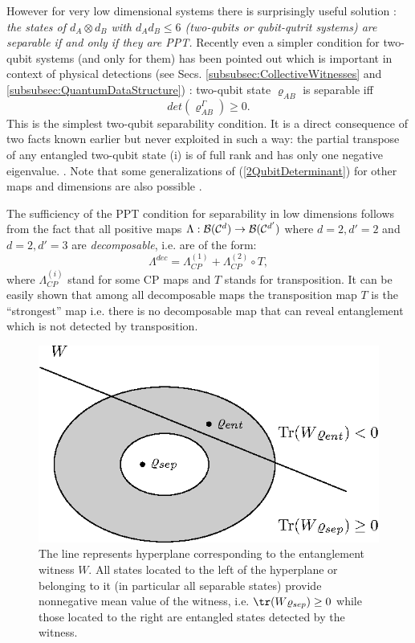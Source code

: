 \documentclass[rmp,12pt,preprint]{revtex4-2}
\begin{document}
However for very low dimensional systems there is surprisingly useful
solution \cite{sep1996}: {\it the states of $d_{A} \otimes d_{B} $
  with $d_{A}d_{B}\leq 6$ (two-qubits or qubit-qutrit systems) are
  separable if and only if they are PPT.} Recently even a simpler
condition for two-qubit systems (and only for them) has been pointed
out \cite{Augusiak} which is important in context of physical
detections (see Secs. \ref{subsubsec:CollectiveWitnesses} and
\ref{subsubsec:QuantumDataStructure}) : two-qubit state $\varrho_{AB}$
is separable iff
\begin{equation}
det(\varrho_{AB}^{\Gamma})\geq 0 \label{2QubitDeterminant}.
\end{equation}
This is the simplest two-qubit separability condition. It is a direct
consequence of two facts known earlier but never exploited in such a
way: the partial transpose of any entangled two-qubit state (i) is of
full rank and has only one negative eigenvalue.
\cite{SanperaTarrachVidal,Verstraete(i-ii)}. Note that some
generalizations of (\ref{2QubitDeterminant}) for other maps and
dimensions are also possible \cite{Augusiak}.

The sufficiency of the PPT condition for separability in low
dimensions follows from the fact \cite{Stoermer,Woronowicz} that all
positive maps $\Lambda:{\cal B}({\cal C}^{d}) \rightarrow {\cal
  B}({\cal C}^{d'}) $ where $d=2,d'=2$ and $d=2,d'=3$ are {\it
  decomposable}, i.e. are of the form:
\begin{equation}
\Lambda^{dec}=\Lambda_{CP}^{(1)} + \Lambda_{CP}^{(2)} \circ T,
\label{decomposablemap}
\end{equation}
where $\Lambda_{CP}^{(i)}$ stand for some CP maps and $T$ stands for
transposition. It can be easily shown \cite{sep1996} that among all
decomposable maps the transposition map $T$ is the ``strongest'' map
i.e. there is no decomposable map that can reveal entanglement which
is not detected by transposition.

\begin{figure}
  \centering
  \includegraphics{fig-witness}
  \caption{The line represents hyperplane corresponding to the
    entanglement witness $W$. All states located to the left of the
    hyperplane or belonging to it (in particular all separable states)
    provide nonnegative mean value of the witness,
    i.e. ${\tr}(W\varrho_{sep}) \ge 0$ while those located to the
    right are entangled states detected by the witness.}
  \label{fig:witness}
\end{figure}
\end{document}
